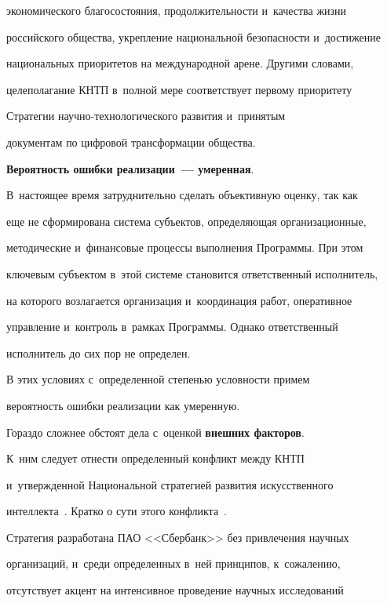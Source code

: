 экономического благосостояния, продолжительности и~качества жизни 

российского общества, укрепление национальной безопасности и~достижение 

национальных приоритетов на международной арене. Другими словами, 

целеполагание КНТП в~полной мере соответствует первому приоритету 

Стратегии на\-уч\-но-тех\-но\-ло\-ги\-че\-ско\-го развития и~принятым 

документам по цифровой трансформации общества. 

    

    \textbf{Вероятность ошибки реализации~--- умеренная}. 

В~настоящее время затруднительно сделать объективную оценку, так как 

еще не сформирована система субъектов, определяющая организационные, 

методические и~финансовые процессы выполнения Программы. При этом 

ключевым субъектом в~этой системе становится ответственный исполнитель, 

на которого возлагается организация и~координация работ, оперативное 

управление и~контроль в~рамках Программы. Однако ответственный 

исполнитель до сих пор не определен. 

    

    В этих условиях с~определенной степенью условности примем 

вероятность ошибки реализации как умеренную. 

    

    Гораздо сложнее обстоят дела с~оценкой \textbf{внешних факторов}. 

К~ним следует отнести определенный конфликт между КНТП 

и~утвержденной Национальной стратегией развития искусственного 

интеллекта~\cite{9-zat}. Кратко о сути этого конфликта~\cite{13-zat}. 

    

    Стратегия разработана ПАО <<Сбербанк>> без привлечения научных 

организаций, и~среди определенных в~ней принципов, к~сожалению, 

отсутствует акцент на интенсивное проведение научных исследований 

